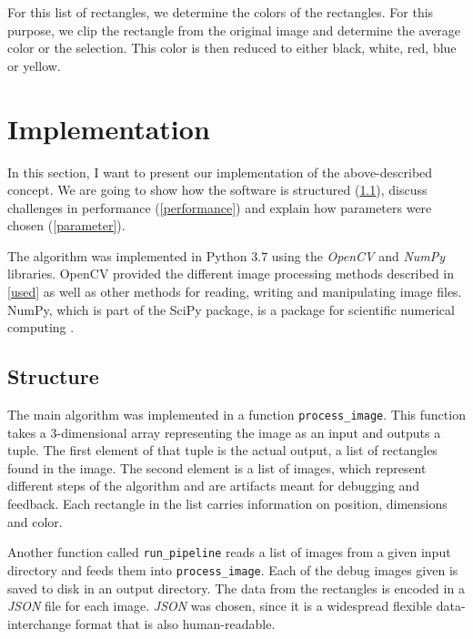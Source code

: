 \documentclass[serif,article,noparskip]{agse-thesis}
\begin{document}
For this list of rectangles, we determine the colors of the rectangles. For this
purpose, we clip the rectangle from the original image and determine the average
color or the selection. This color is then reduced to either black, white, red,
blue or yellow.

\section{Implementation} \label{implementation}

In this section, I want to present our implementation of the above-described
concept. We are going to show how the software is structured
(\ref{structure}), discuss challenges in performance (\ref{performance}) and
explain how parameters were chosen (\ref{parameter}).

The algorithm was implemented in Python 3.7 using the \textit{OpenCV} and
\textit{NumPy} libraries. OpenCV provided the different image processing methods
described in \ref{used} as well as other methods for reading, writing and
manipulating image files. NumPy, which is part of the SciPy package, is a
package for scientific numerical computing \cite{scipy}.


\subsection{Structure} \label{structure}

The main algorithm was implemented in a function \texttt{process\_image}. This
function takes a 3-dimensional array representing the image as an input and
outputs a tuple. The first element of that tuple is the actual output, a list of
rectangles found in the image. The second element is a list of images, which
represent different steps of the algorithm and are artifacts meant for debugging
and feedback. Each rectangle in the list carries information on position, dimensions
and color.


Another function called \texttt{run\_pipeline} reads a list of images from a
given input directory and feeds them into \texttt{process\_image}. Each of the
debug images given is saved to disk in an output directory. The data from the
rectangles is encoded in a \textit{JSON} file for each image. \textit{JSON} was
chosen, since it is a widespread flexible data-interchange format that is also
human-readable.
\end{document}
